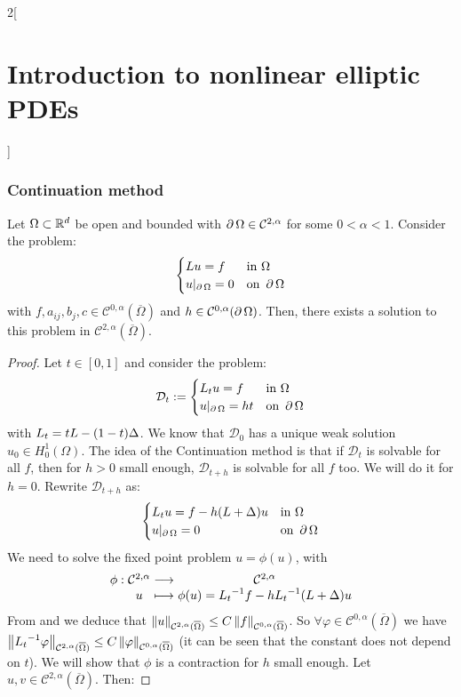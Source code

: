 \documentclass[../../../main_math.tex]{subfiles}
\begin{document}
\begin{multicols}{2}[\section{Introduction to nonlinear elliptic PDEs}]
  \subsubsection{Continuation method}
  \begin{theorem}
    Let $\Omega\subset\mathbb{R}^d$ be open and bounded with $\operatorname{\partial}{\Omega}\in\mathcal{C}^{2,\alpha}$ for some $0<\alpha<1$. Consider the problem:
    $$
      \begin{cases}
        Lu=f               & \text{in }\Omega      \\
        u|_{\operatorname{\partial}{\Omega}}=0 & \text{on }\operatorname{\partial}{\Omega}
      \end{cases}
    $$
    with $f,a_{ij},b_j,c\in\mathcal{C}^{0,\alpha}( \overline{\Omega})$ and $h\in\mathcal{C}^{0,\alpha}(\operatorname{\partial}{\Omega})$. Then, there exists a solution to this problem in $\mathcal{C}^{2,\alpha}(\overline{\Omega})$.
  \end{theorem}
  \begin{proof}
    Let $t\in [0,1]$ and consider the problem:
    $$ \mathcal{D}_t:= \begin{cases}
        L_tu=f              & \text{in }\Omega      \\
        u|_{\operatorname{\partial}{\Omega}}=ht & \text{on }\operatorname{\partial}{\Omega}
      \end{cases}$$
    with $L_t=tL-(1-t)\Delta$. We know that $\mathcal{D}_0$ has a unique weak solution $u_0\in H_0^1(\Omega)$. The idea of the Continuation method is that if $\mathcal{D}_t$ is solvable for all $f$, then for $h>0$ small enough, $\mathcal{D}_{t+h}$ is solvable for all $f$ too. We will do it for $h=0$. Rewrite $\mathcal{D}_{t+h}$ as:
    $$
      \begin{cases}
        L_{t}u=f-h(L+\Delta)u & \text{in }\Omega      \\
        u|_{\operatorname{\partial}{\Omega}}=0        & \text{on }\operatorname{\partial}{\Omega}
      \end{cases}
    $$
    We need to solve the fixed point problem $u=\phi(u)$, with
    $$
      \function{\phi}{\mathcal{C}^{2,\alpha}}{\mathcal{C}^{2,\alpha}}{u}{\phi(u)={L_t}^{-1}f - h{L_t}^{-1}(L+\laplacian)u}
    $$
    From  and  we deduce that $\left\|u\right\|_{\mathcal{C}^{2,\alpha}(\overline{\Omega})}\leq C\left\|f\right\|_{\mathcal{C}^{0,\alpha}(\overline{\Omega})}$. So $\forall \varphi\in \mathcal{C}^{0,\alpha}(\overline{\Omega})$ we have $\left\|{L_t}^{-1}\varphi\right\|_{\mathcal{C}^{2,\alpha}(\overline{\Omega})}\leq C\left\|\varphi\right\|_{\mathcal{C}^{0,\alpha}(\overline{\Omega})}$ (it can be seen that the constant does not depend on $t$). We will show that $\phi$ is a contraction for $h$ small enough. Let $u,v\in \mathcal{C}^{2,\alpha}(\overline{\Omega})$. Then:

\end{proof}
\end{multicols}
\end{document}
